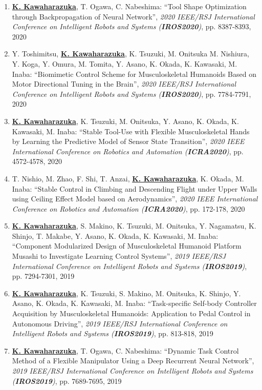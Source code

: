 \documentclass[letterpaper]{article}
\begin{document}
\begin{enumerate}
\item \underline{\textbf{K. Kawaharazuka}}, T. Ogawa, C. Nabeshima: ``Tool Shape Optimization through Backpropagation of Neural Network'', \textit{2020 IEEE/RSJ International Conference on Intelligent Robots and Systems (\textit{\textbf{IROS2020}})}, pp. 8387-8393, 2020
\item Y. Toshimitsu, \underline{\textbf{K. Kawaharazuka}}, K. Tsuzuki, M. Onitsuka M. Nishiura, Y. Koga, Y. Omura, M. Tomita, Y. Asano, K. Okada, K. Kawasaki, M. Inaba: ``Biomimetic Control Scheme for Musculoskeletal Humanoids Based on Motor Directional Tuning in the Brain'', \textit{2020 IEEE/RSJ International Conference on Intelligent Robots and Systems (\textit{\textbf{IROS2020}})}, pp. 7784-7791, 2020
\item \underline{\textbf{K. Kawaharazuka}}, K. Tsuzuki, M. Onitsuka, Y. Asano, K. Okada, K. Kawasaki, M. Inaba: ``Stable Tool-Use with Flexible Musculoskeletal Hands by Learning the Predictive Model of Sensor State Transition'', \textit{2020 IEEE International Conference on Robotics and Automation (\textit{\textbf{ICRA2020}})}, pp. 4572-4578, 2020
\item T. Nishio, M. Zhao, F. Shi, T. Anzai, \underline{\textbf{K. Kawaharazuka}}, K. Okada, M. Inaba: ``Stable Control in Climbing and Descending Flight under Upper Walls using Ceiling Effect Model based on Aerodynamics'', \textit{2020 IEEE International Conference on Robotics and Automation (\textit{\textbf{ICRA2020}})}, pp. 172-178, 2020
\item \underline{\textbf{K. Kawaharazuka}}, S. Makino, K. Tsuzuki, M. Onitsuka, Y. Nagamatsu, K. Shinjo, T. Makabe, Y. Asano, K. Okada, K. Kawasaki, M. Inaba: ``Component Modularized Design of Musculoskeletal Humanoid Platform Musashi to Investigate Learning Control Systems'', \textit{2019 IEEE/RSJ International Conference on Intelligent Robots and Systems (\textit{\textbf{IROS2019}})}, pp. 7294-7301, 2019
\item \underline{\textbf{K. Kawaharazuka}}, K. Tsuzuki, S. Makino, M. Onitsuka, K. Shinjo, Y. Asano, K. Okada, K. Kawasaki, M. Inaba: ``Task-specific Self-body Controller Acquisition by Musculoskeletal Humanoids: Application to Pedal Control in Autonomous Driving'', \textit{2019 IEEE/RSJ International Conference on Intelligent Robots and Systems (\textit{\textbf{IROS2019}})}, pp. 813-818, 2019
\item \underline{\textbf{K. Kawaharazuka}}, T. Ogawa, C. Nabeshima: ``Dynamic Task Control Method of a Flexible Manipulator Using a Deep Recurrent Neural Network'', \textit{2019 IEEE/RSJ International Conference on Intelligent Robots and Systems (\textit{\textbf{IROS2019}})}, pp. 7689-7695, 2019

\end{enumerate}
\end{document}
